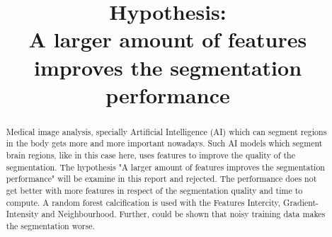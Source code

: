 \documentclass[conference]{IEEEtran}
\begin{document}
\title{Hypothesis: \\ A larger amount of features improves the segmentation performance\\
}

\author{
\and
{}
\and
{}
}

\maketitle






\begin{abstract}
Medical image analysis, specially Artificial Intelligence (AI) which can segment regions in the body gets more and more important nowadays. Such AI models which segment brain regions, like in this case here, uses features to improve the quality of the segmentation. The hypothesis "A larger amount of features improves the segmentation performance" will be examine in this report and rejected. The performance does not get better with more features in respect of the segmentation quality and time to compute. A random forest calcification is used with the Features Intercity, Gradient-Intensity and Neighbourhood. Further, could be shown that noisy training data makes the segmentation worse.
\end{abstract}
\end{document}
